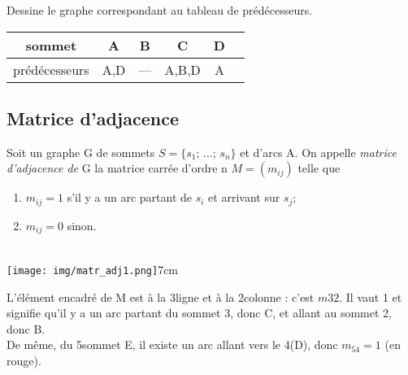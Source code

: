 \documentclass[a4paper,12pt]{book}
\begin{document}
\begin{exercice}[]
Dessine le graphe correspondant au tableau de prédécesseurs.
\begin{center}
\begin{tabular}{|c|c|c|c|c|c|}
\hline
sommet 		& A		 & B 		& C		 & D \\
\hline
prédécesseurs & A,D 	& --- 	& A,B,D 		& A\\
\hline
\end{tabular}
\end{center}
\end{exercice}

\subsection{Matrice d'adjacence}

\begin{definition}

Soit un graphe G de sommets  $S=\{s_1;\,...;\,s_n\}$ et d'arcs A. On appelle \textit{matrice d'adjacence de} G la matrice carrée d'ordre n $M=(m_{ij})$ telle que 
\begin{enumerate}[--]
	\item 	$m_{ij}=1$ s'il y a un arc partant de $s_i$ et arrivant sur $s_j$;
	\item 	$m_{ij}=0$ sinon.
\end{enumerate}
\end{definition}

\begin{exemple}[]
\ \\[-.2em]
{\texttt{[image: img/matr\_adj1.png]}}{7cm}

L'élément encadré de M est à la 3\eme ligne et à la 2\eme colonne : c'est $m32$. Il vaut 1 et signifie qu'il y a un arc partant du sommet 3, donc C, et allant au sommet 2, donc B.\\
De même, du 5\eme sommet E, il existe un arc allant vers le 4\eme (D), donc $m_{54}=1$ (en rouge).
\end{exemple}
\end{document}
